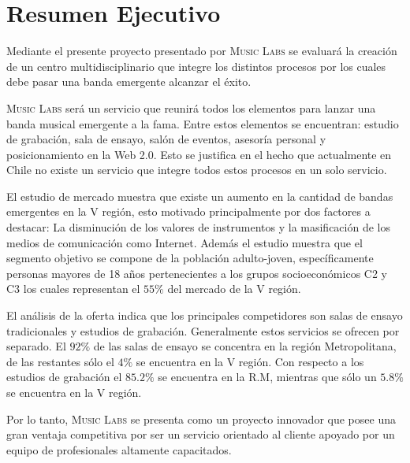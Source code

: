\section{Resumen Ejecutivo}
Mediante el presente proyecto presentado por \textsc{Music Labs}
se evaluará la creación de un centro multidisciplinario que integre los
distintos procesos por los cuales debe pasar una banda emergente alcanzar el éxito.


\textsc{Music Labs} será un servicio que reunirá todos los elementos para lanzar
una banda musical emergente a la fama. Entre estos elementos se encuentran:
estudio de grabación, sala de ensayo, salón de eventos, asesoría personal 
y posicionamiento en la Web 2.0. Esto se justifica en el hecho que actualmente
en Chile no existe un servicio que integre todos estos procesos en un solo servicio.

El estudio de mercado muestra que existe un aumento en la cantidad de 
bandas emergentes en la V región, esto motivado principalmente por dos factores a destacar:
La disminución de los valores de instrumentos y la masificación de los medios de 
comunicación como Internet. Además el estudio muestra que el segmento
objetivo se compone de la población adulto-joven, específicamente personas mayores 
de 18 años pertenecientes a los grupos socioeconómicos C2 y C3 los cuales representan 
el $55\%$ del mercado de la V región.

El análisis de la oferta indica que los principales competidores son salas de 
ensayo tradicionales y estudios de grabación. Generalmente estos servicios se 
ofrecen por separado. El $92\%$ de las salas de ensayo se concentra en la región
Metropolitana, de las restantes sólo el $4\%$ se encuentra en la V región.
Con respecto a los estudios de grabación el $85.2\%$ se encuentra en la R.M, mientras
que sólo un $5.8\%$ se encuentra en la V región.

 Por lo tanto, \textsc{Music Labs} se presenta como un proyecto innovador 
que posee una gran ventaja competitiva por ser un servicio
orientado al cliente apoyado por un equipo de profesionales altamente capacitados.

